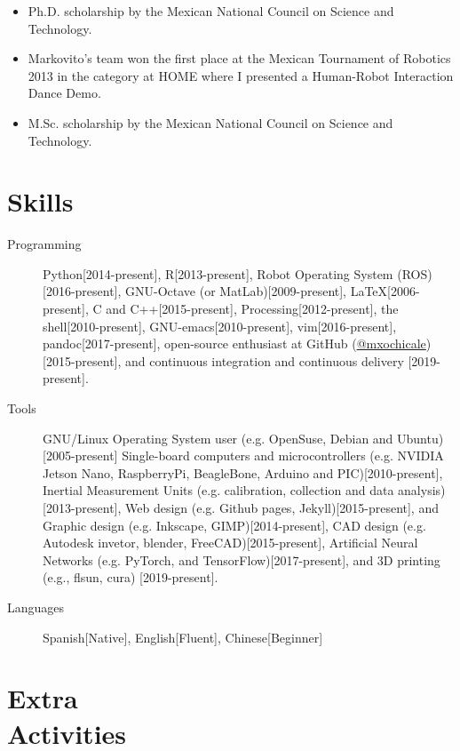 \documentclass{mycv}
\begin{document}
\begin{itemize}
\item Ph.D. scholarship by the Mexican National Council on Science and Technology. 

\item Markovito's team  won the first place at the Mexican Tournament of Robotics 2013 in the category at HOME where I presented a Human-Robot Interaction Dance Demo. \href{https://www.youtube.com/watch?v=Kw-lZam_qZI}{\faYoutube} 

\item M.Sc. scholarship by the Mexican National Council on Science and Technology. 
\end{itemize}


\section{Skills}
\begin{description}
  \item[Programming] Python[2014-present],
R[2013-present], 
Robot Operating System (ROS)[2016-present],
GNU-Octave (or MatLab)[2009-present],
\LaTeX [2006-present], 
C and C++[2015-present],
Processing[2012-present], 
the shell[2010-present], 
GNU-emacs[2010-present],
vim[2016-present], 
pandoc[2017-present],
open-source enthusiast at GitHub (\href{https://github.com/mxochicale}{@mxochicale})[2015-present], 
and continuous integration and continuous delivery [2019-present]. 
  \item[Tools] 
GNU/Linux Operating System user (e.g. OpenSuse, Debian and Ubuntu)[2005-present]
Single-board computers and microcontrollers (e.g. 
NVIDIA Jetson Nano, RaspberryPi, BeagleBone, Arduino and PIC)[2010-present],
Inertial Measurement Units (e.g. calibration, collection and data analysis)[2013-present], 
Web design (e.g. Github pages, Jekyll)[2015-present], and
Graphic design (e.g. Inkscape, GIMP)[2014-present],
CAD design (e.g. Autodesk invetor, blender, FreeCAD)[2015-present], 
Artificial Neural Networks (e.g. PyTorch, and TensorFlow)[2017-present], and
3D printing (e.g., flsun, cura) [2019-present].
  \item[Languages] Spanish[Native], English[Fluent], Chinese[Beginner]
\end{description}




\section{Extra \\ Activities}
\end{document}
